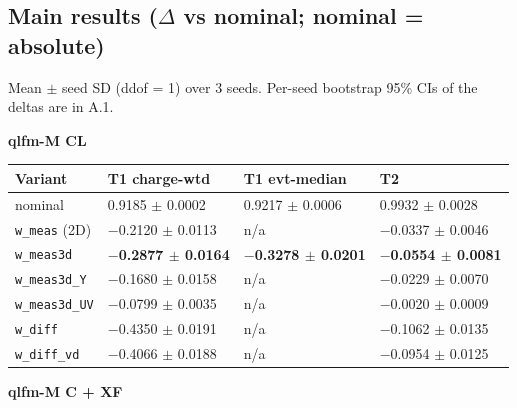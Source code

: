 \documentclass[10pt,a4paper]{article}
\begin{document}
\subsection{Main results ($\Delta$ vs nominal; nominal = absolute)}
Mean $\pm$ seed SD (ddof = 1) over 3 seeds. Per-seed bootstrap 95\% CIs of the deltas are in A.1.

\textbf{qlfm-M CL}

\begin{center}\small
\setlength{\tabcolsep}{3pt}\renewcommand{\arraystretch}{1.15}
\begin{tabularx}{\linewidth}{LLLL}
\toprule
\textbf{Variant} & \textbf{T1 charge-wtd} & \textbf{T1 evt-median} & \textbf{T2} \\
\midrule
nominal & 0.9185 $\pm$ 0.0002 & 0.9217 $\pm$ 0.0006 & 0.9932 $\pm$ 0.0028 \\
\texttt{w\_\allowbreak{}meas} (2D) & $-$0.2120 $\pm$ 0.0113 & n/a & $-$0.0337 $\pm$ 0.0046 \\
\texttt{w\_\allowbreak{}meas3d} & \textbf{$-$0.2877 $\pm$ 0.0164} & \textbf{$-$0.3278 $\pm$ 0.0201} & \textbf{$-$0.0554 $\pm$ 0.0081} \\
\texttt{w\_\allowbreak{}meas3d\_\allowbreak{}Y} & $-$0.1680 $\pm$ 0.0158 & n/a & $-$0.0229 $\pm$ 0.0070 \\
\texttt{w\_\allowbreak{}meas3d\_\allowbreak{}UV} & $-$0.0799 $\pm$ 0.0035 & n/a & $-$0.0020 $\pm$ 0.0009 \\
\texttt{w\_\allowbreak{}diff} & $-$0.4350 $\pm$ 0.0191 & n/a & $-$0.1062 $\pm$ 0.0135 \\
\texttt{w\_\allowbreak{}diff\_\allowbreak{}vd} & $-$0.4066 $\pm$ 0.0188 & n/a & $-$0.0954 $\pm$ 0.0125 \\
\bottomrule
\end{tabularx}
\end{center}
\textbf{qlfm-M C + XF}
\end{document}
